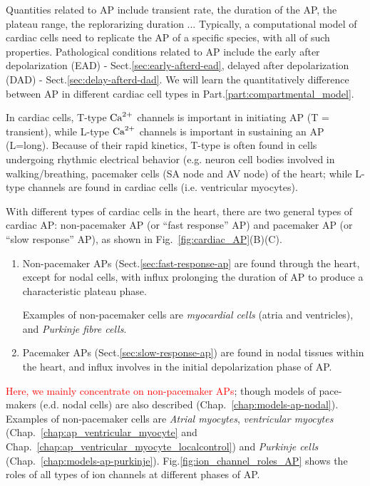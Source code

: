 Quantities related to AP include transient rate, the duration of the AP, the
plateau range, the replorarizing duration ...  Typically, a computational model
of cardiac cells need to replicate the AP of a specific species, with all of
such properties. Pathological conditions related to AP include the early after
depolarization (EAD) - Sect.\ref{sec:early-afterd-ead}, delayed after
depolarization (DAD) - Sect.\ref{sec:delay-afterd-dad}. We will learn the
quantitatively difference between AP in different cardiac cell types in
Part.\ref{part:compartmental_model}.

\begin{framed}
  In cardiac cells, T-type ${\text{Ca}^{2+}}$ channels is important in initiating AP (T =
  transient), while L-type ${\text{Ca}^{2+}}$ channels is important in sustaining an AP
  (L=long). Because of their rapid kinetics, T-type is often found in
  cells undergoing rhythmic electrical behavior (e.g. neuron cell bodies
  involved in walking/breathing, pacemaker cells (SA node and AV node)
  of the heart; while L-type channels are found in cardiac cells
  (i.e. ventricular myocytes).
\end{framed}



With different types of cardiac cells in the heart, there are two general types
of cardiac AP: non-pacemaker AP (or ``fast response'' AP) and pacemaker AP (or
``slow response'' AP), as shown in Fig.~\ref{fig:cardiac_AP}(B)(C).
\begin{enumerate}
\item Non-pacemaker APs (Sect.\ref{sec:fast-response-ap} are found through the
heart, except for nodal cells, with  influx prolonging the duration of AP to
  produce a characteristic plateau phase.

Examples of non-pacemaker cells are {\it myocardial cells} (atria and
ventricles), and {\it Purkinje fibre cells}.

\item Pacemaker APs (Sect.\ref{sec:slow-response-ap}) are found in nodal tissues
within the heart, and  influx involves in the initial depolarization
phase of  AP.
\end{enumerate}
\textcolor{red}{Here, we mainly concentrate on non-pacemaker APs}; though models
of pace-makers (e.d. nodal cells) are also described
(Chap.~\ref{chap:models-ap-nodal}). Examples of non-pacemaker cells are {\it
Atrial myocytes}, {\it ventricular myocytes}
(Chap.~\ref{chap:ap_ventricular_myocyte} and
Chap.~\ref{chap:ap_ventricular_myocyte_localcontrol}) and {\it Purkinje cells}
(Chap.~\ref{chap:models-ap-purkinje}). Fig.\ref{fig:ion_channel_roles_AP} shows
the roles of all types of ion channels at different phases of AP.
 

